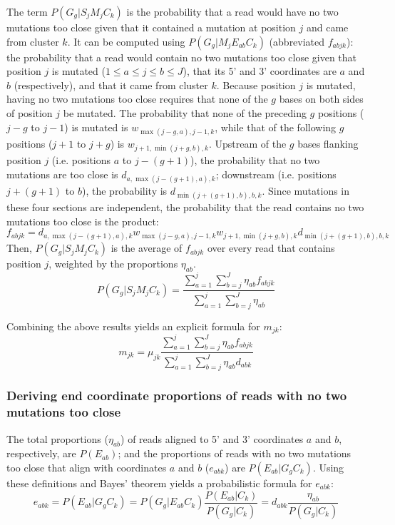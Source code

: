 \documentclass[11pt]{article}
\begin{document}
The term $P(G_g | S_j M_j C_k)$ is the probability that a read would have no two mutations too close given that it contained a mutation at position $j$ and came from cluster $k$.
It can be computed using $P(G_g | M_j E_{ab} C_k)$ (abbreviated $f_{abjk}$): the probability that a read would contain no two mutations too close given that position $j$ is mutated ($1 \le a \le j \le b \le J$), that its 5' and 3' coordinates are $a$ and $b$ (respectively), and that it came from cluster $k$.
Because position $j$ is mutated, having no two mutations too close requires that none of the $g$ bases on both sides of position $j$ be mutated.
The probability that none of the preceding $g$ positions ($j - g$ to $j - 1$) is mutated is $w_{\max(j-g,a),j-1,k}$, while that of the following $g$ positions ($j + 1$ to $j + g$) is $w_{j+1,\min(j+g,b),k}$.
Upstream of the $g$ bases flanking position $j$ (i.e. positions $a$ to $j - (g + 1)$), the probability that no two mutations are too close is $d_{a,\max(j-(g+1),a),k}$; downstream (i.e. positions $j + (g + 1)$ to $b$), the probability is $d_{\min(j+(g+1),b),b,k}$.
Since mutations in these four sections are independent, the probability that the read contains no two mutations too close is the product:
$$f_{abjk} = d_{a,\max(j-(g+1),a),k} w_{\max(j-g,a),j-1,k} w_{j+1,\min(j+g,b),k} d_{\min(j+(g+1),b),b,k}$$
Then, $P(G_g | S_j M_j C_k)$ is the average of $f_{abjk}$ over every read that contains position $j$, weighted by the proportions $\eta_{ab}$.
$$P(G_g | S_j M_j C_k) = \frac{\sum_{a=1}^{j}\sum_{b=j}^{J}\eta_{ab} f_{abjk}}{\sum_{a=1}^{j}\sum_{b=j}^{J}\eta_{ab}}$$

Combining the above results yields an explicit formula for $m_{jk}$:
$$m_{jk} = \mu_{jk} \frac{\sum_{a=1}^{j}\sum_{b=j}^{J}\eta_{ab} f_{abjk}}{\sum_{a=1}^{j}\sum_{b=j}^{J}\eta_{ab}d_{abk}}$$

\subsubsection{Deriving end coordinate proportions of reads with no two mutations too close}
\label{calc_p_ends_noclose}

The total proportions ($\eta_{ab}$) of reads aligned to 5' and 3' coordinates $a$ and $b$, respectively, are $P(E_{ab})$; and the proportions of reads with no two mutations too close that align with coordinates $a$ and $b$ ($e_{abk}$) are $P(E_{ab} | G_g C_k)$.
Using these definitions and Bayes' theorem yields a probabilistic formula for $e_{abk}$:
$$e_{abk} = P(E_{ab} | G_g C_k) = P(G_g | E_{ab} C_k) \frac{P(E_{ab} | C_k)}{P(G_g | C_k)} = d_{abk} \frac{\eta_{ab}}{P(G_g | C_k)}$$
\end{document}
